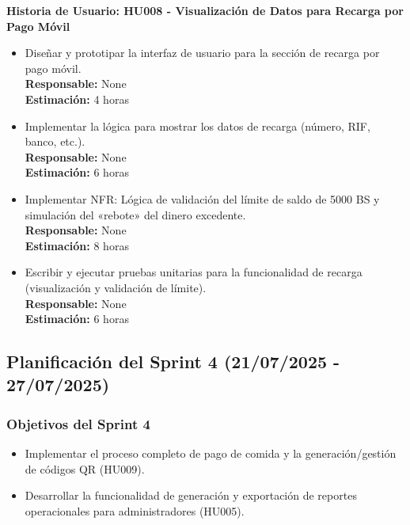 \documentclass[12pt]{article}
\begin{document}
\textbf{Historia de Usuario: HU008 - Visualización de Datos para Recarga por Pago Móvil}
\begin{itemize}
	\item Diseñar y prototipar la interfaz de usuario para la sección de recarga por pago móvil. \\
	\textbf{Responsable:} None \\
	\textbf{Estimación:} 4 horas
	\item Implementar la lógica para mostrar los datos de recarga (número, RIF, banco, etc.). \\
	\textbf{Responsable:} None \\
	\textbf{Estimación:} 6 horas
	\item Implementar NFR: Lógica de validación del límite de saldo de 5000 BS y simulación del «rebote» del dinero excedente. \\
	\textbf{Responsable:} None \\
	\textbf{Estimación:} 8 horas
	\item Escribir y ejecutar pruebas unitarias para la funcionalidad de recarga (visualización y validación de límite). \\
	\textbf{Responsable:} None \\
	\textbf{Estimación:} 6 horas
\end{itemize}

\subsection{Planificación del Sprint 4 (21/07/2025 - 27/07/2025)}

\subsubsection{Objetivos del Sprint 4}
\begin{itemize}
	\item Implementar el proceso completo de pago de comida y la generación/gestión de códigos QR (HU009).
	\item Desarrollar la funcionalidad de generación y exportación de reportes operacionales para administradores (HU005).
\end{itemize}
\end{document}

